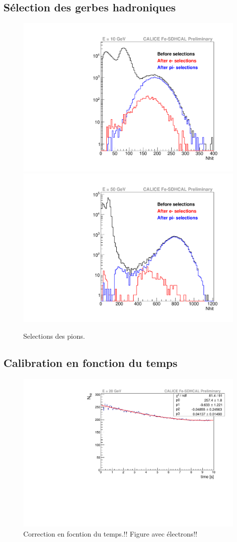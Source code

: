\subsection{Sélection des gerbes hadroniques}
\begin{figure}[!h]
  \begin{center}
    \includegraphics[width=.45\textwidth]{SDHCAL/figs/selection715693.pdf}
    \includegraphics[width=.45\textwidth]{SDHCAL/figs/selection715751.pdf}
    \caption{Selections des pions.}
    \label{fig:pion_selection}
  \end{center}
\end{figure}

\subsection{Calibration en fonction du temps}
\begin{figure}[!h]
  \begin{center}
    \includegraphics[width=.7\textwidth]{SDHCAL/figs/timeFit.pdf}
    \caption{Correction en focntion du temps.!! Figure avec électrons!!}
    \label{fig:time_correction}
  \end{center}
\end{figure}

